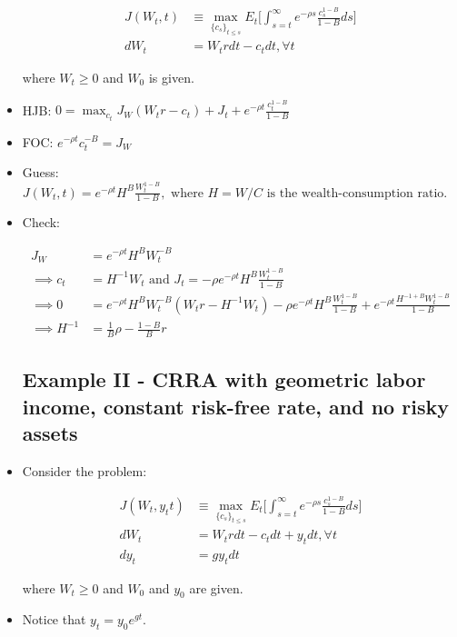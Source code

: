 \documentclass{article}
\begin{document}
\begin{itemize}
\begin{align*}
J(W_t, t) &\equiv \max_{\{c_s\}_{t \le s}} E_t \Bigg[ \int_{s=t}^\infty e^{-\rho s} \frac{c_s^{1-B}}{1-B} ds \Bigg] \\
dW_t &= W_t r dt - c_t dt, \forall t
\end{align*}

where $W_t \ge 0$ and $W_0$ is given.

\item HJB: $0 = \max_{c_t} J_W(W_tr - c_t) + J_t + e^{-\rho t} \frac{c_t^{1-B}}{1-B}$

\item FOC: $e^{-\rho t} c_t^{-B} = J_W$

\item Guess: $J(W_t, t) = e^{-\rho t} H^B \frac{W_t^{1-B}}{1-B}, \text{ where } H = W/C \text{ is the wealth-consumption ratio.}$

\item Check: 

\begin{align*}
J_W &= e^{-\rho t} H^B W_t^{-B} \\
\implies c_t &= H^{-1} W_t \text{ and } J_t = -\rho e^{-\rho t} H^B \frac{W_t^{1-B}}{1 - B} \\
\implies 0 &= e^{-\rho t} H^B W_t^{-B}(W_t r - H^{-1} W_t) - \rho e^{-\rho t} H^B \frac{W_t^{1-B}}{1-B} + e^{-\rho t} \frac{H^{-1+B} W_t^{1-B}}{1-B} \\
\implies
H^{-1} &= \frac{1}{B} \rho - \frac{1 - B}{B} r
\end{align*}

\subsection*{Example II - CRRA with geometric labor income, constant risk-free rate, and no risky assets}

\item Consider the problem:

\begin{align*}
J(W_t, y_t t) &\equiv \max_{\{c_s\}_{t \le s}} E_t \Bigg[ \int_{s=t}^\infty e^{-\rho s} \frac{c_s^{1-B}}{1-B} ds \Bigg] \\
dW_t &= W_t r dt - c_t dt + y_t dt, \forall t \\
dy_t &= g y_t dt 
\end{align*}

where $W_t \ge 0$ and $W_0$ and $y_0$ are given.

\item Notice that $y_t = y_0 e^{gt}$.


\end{itemize}
\end{document}
